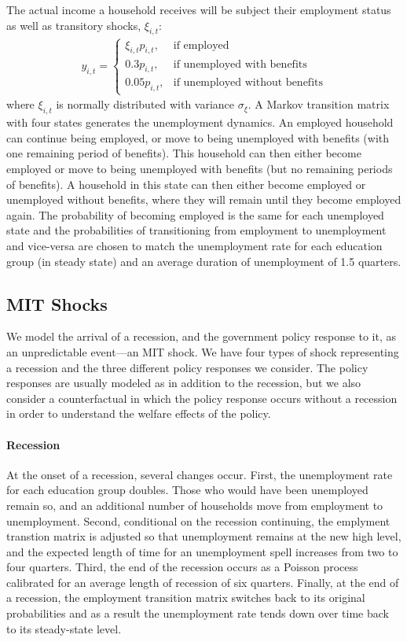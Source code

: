 \documentclass[11pt]{article}
\begin{document}
	The actual income a household receives will be subject their employment status as well as transitory shocks, $\xi_{i,t}$:
	\begin{align}
		y_{i,t} =   \begin{cases}
						\xi_{i,t}p_{i,t}, & \text{if employed} \\
						0.3 p_{i,t}, & \text{if unemployed with benefits} \\
						0.05 p_{i,t}, & \text{if unemployed without benefits} 
					\end{cases}
	\end{align}
	where $\xi_{i,t}$ is normally distributed with variance $\sigma_{\xi}$. A Markov transition matrix with four states generates the unemployment dynamics. An employed household can continue being employed, or move to being unemployed with benefits (with one remaining period of benefits). This household can then either become employed or move to being unemployed with benefits (but no remaining periods of benefits). A household in this state can then either become employed or unemployed without benefits, where they will remain until they become employed again. The probability of becoming employed is the same for each unemployed state and the probabilities of transitioning from employment to unemployment and vice-versa are chosen to match the unemployment rate for each education group (in steady state) and an average duration of unemployment of 1.5 quarters.
	
	\subsection{MIT Shocks}
	We model the arrival of a recession, and the government policy response to it, as an unpredictable event---an MIT shock. We have four types of shock representing a recession and the three different policy responses we consider. The policy responses are usually modeled as in addition to the recession, but we also consider a counterfactual in which the policy response occurs without a recession in order to understand the welfare effects of the policy.
	
	\paragraph{Recession} At the onset of a recession, several changes occur. First, the unemployment rate for each education group doubles. Those who would have been unemployed remain so, and an additional number of households move from employment to unemployment. Second, conditional on the recession continuing, the emplyment transtion matrix is adjusted so that unemployment remains at the new high level, and the expected length of time for an unemployment spell increases from two to four quarters. Third, the end of the recession occurs as a Poisson process calibrated for an average length of recession of six quarters. Finally, at the end of a recession, the employment transition matrix switches back to its original probabilities and as a result the unemployment rate tends down over time back to its steady-state level.
	
\end{document}
